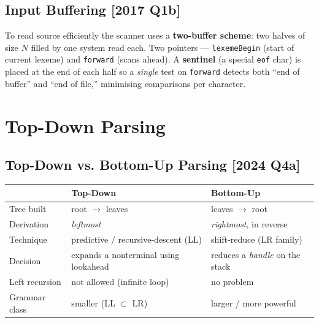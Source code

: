\documentclass[12pt, a4paper]{article}
\newenvironment{qbox}{\begin{mdframed}[style=qframe]}{\end{mdframed}}
\newcommand{\yr}[1]{{\small\color{accent}\textbf{[#1]}}}
\newcommand{\term}[1]{\textbf{\color{keyblue}#1}}
\begin{document}
\subsection{Input Buffering \yr{2017 Q1b}}
\begin{qbox}
To read source efficiently the scanner uses a \term{two-buffer scheme}: two halves of size $N$ filled by one system read each.
Two pointers — \texttt{lexemeBegin} (start of current lexeme) and \texttt{forward} (scans ahead). A \term{sentinel} (a
special \texttt{eof} char) is placed at the end of each half so a \emph{single} test on \texttt{forward} detects both
``end of buffer'' and ``end of file,'' minimising comparisons per character.
\end{qbox}

\section{Top-Down Parsing}

\subsection{Top-Down vs. Bottom-Up Parsing \yr{2024 Q4a}}
\begin{qbox}
\begin{tabularx}{\linewidth}{@{}l Y Y@{}}
\toprule
 & \textbf{Top-Down} & \textbf{Bottom-Up}\\
\midrule
Tree built & root $\to$ leaves & leaves $\to$ root\\
Derivation & \emph{leftmost} & \emph{rightmost}, in reverse\\
Technique & predictive / recursive-descent (LL) & shift-reduce (LR family)\\
Decision & expands a nonterminal using lookahead & reduces a \emph{handle} on the stack\\
Left recursion & not allowed (infinite loop) & no problem\\
Grammar class & smaller (LL $\subset$ LR) & larger / more powerful\\
\bottomrule
\end{tabularx}
\end{qbox}
\end{document}
